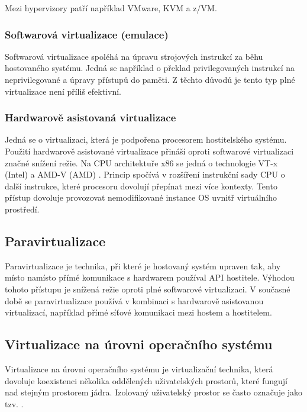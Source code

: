 Mezi hypervizory patří například VMware, KVM a z/VM.

\subsubsection{Softwarová virtualizace (emulace)}

Softwarová virtualizace spoléhá na úpravu strojových instrukcí za běhu hostovaného systému.
Jedná se například o překlad privilegovaných instrukcí na neprivilegované a úpravy přístupů do paměti.
Z těchto důvodů je tento typ plné virtualizace není příliš efektivní.

\subsubsection{Hardwarově asistovaná virtualizace}

Jedná se o virtualizaci, která je podpořena procesorem hostitelského systému.
Použití hardwarově asistované virtualizace přináší oproti softwarové virtualizaci značné snížení režie.
Na CPU architektuře x86 se jedná o technologie VT-x (Intel) \cite{vt_x} a AMD-V (AMD) \cite{amd_v}.
Princip spočívá v rozšíření instrukční sady CPU o další instrukce, které procesoru dovolují přepínat mezi více kontexty.
Tento přístup dovoluje provozovat nemodifikované instance OS uvnitř virtuálního prostředí.

\subsection{Paravirtualizace}

Paravirtualizace je technika, při které je hostovaný systém upraven tak, aby místo namísto přímé komunikace s hardwarem používal API hostitele.
Výhodou tohoto přístupu je snížená režie oproti plné softwarové virtualizaci.
V současné době se paravirtualizace používá v kombinaci s hardwarově asistovanou virtualizací, například přímé síťové komunikaci mezi hostem a hostitelem.


\subsection{Virtualizace na úrovni operačního systému}

Virtualizace na úrovni operačního systému je virtualizační technika, která dovoluje koexistenci několika oddělených uživatelských prostorů, které fungují nad stejným prostorem jádra.
Izolovaný uživatelský prostor se často označuje jako tzv. .

